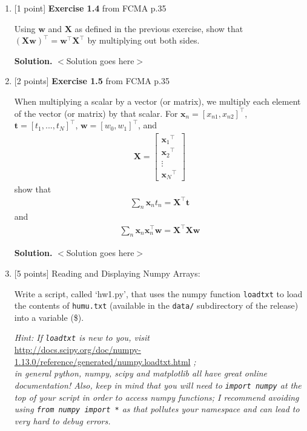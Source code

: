 \documentclass[10pt]{article}
\begin{document}
\begin{enumerate}
{\bf Solution.} $<$Solution goes here$>$\\


\item \label{prob:4} [1 point]
{\bf Exercise 1.4} from FCMA p.35

Using $\mathbf{w}$ and $\mathbf{X}$ as defined in the previous exercise, show that ${(\mathbf{X}\mathbf{w})}^\top = {\mathbf{w}}^\top{\mathbf{X}}^\top$ by multiplying out both sides.

{\bf Solution.} $<$Solution goes here$>$\\



\item \label{prob:5} [2 points]
{\bf Exercise 1.5} from FCMA p.35  %

When multiplying a scalar by a vector (or matrix), we multiply each element of the vector (or matrix) by that scalar.  For $\mathbf{x}_n = {[ x_{n1}, x_{n2} ]}^\top$, $\mathbf{t} = {[ t_1,...,t_N ]}^\top$, $\mathbf{w} = {[ w_0, w_1 ]}^\top$, and
\begin{eqnarray*}
\mathbf{X} = 
    \begin{bmatrix}
    {\mathbf{x}_{1}}^\top \\[0.3em]
    {\mathbf{x}_{2}}^\top \\[0.3em]
    \vdots \\[0.3em]
    {\mathbf{x}_{N}}^\top
    \end{bmatrix}
\end{eqnarray*}
show that
\begin{eqnarray*}
\sum_{n} \mathbf{x}_n t_n = \mathbf{X}^\top\mathbf{t}
\end{eqnarray*}
and
\begin{eqnarray*}
\sum_{n} \mathbf{x}_n \mathbf{x}_n ^\top \mathbf{w} = \mathbf{X}^\top\mathbf{X} \mathbf{w}
\end{eqnarray*}

{\bf Solution.} $<$Solution goes here$>$\\


\newpage
\item \label{prob:6} [5 points]
Reading and Displaying Numpy Arrays:

Write a script, called `hw1.py', that uses the numpy function {\tt loadtxt} to load the contents of {\tt humu.txt} (available in the {\tt data/} subdirectory of the release) into a variable (\$).

{\em Hint: If {\tt loadtxt} is new to you, visit} \\
\url{http://docs.scipy.org/doc/numpy-1.13.0/reference/generated/numpy.loadtxt.html} {\em ; \\ in general python, numpy, scipy and matplotlib all have great online documentation!  Also, keep in mind that you will need to {\tt import numpy} at the top of your script in order to access numpy functions; I recommend avoiding using {\tt from numpy import *} as that pollutes your namespace and can lead to very hard to debug errors. }


\end{enumerate}
\end{document}
